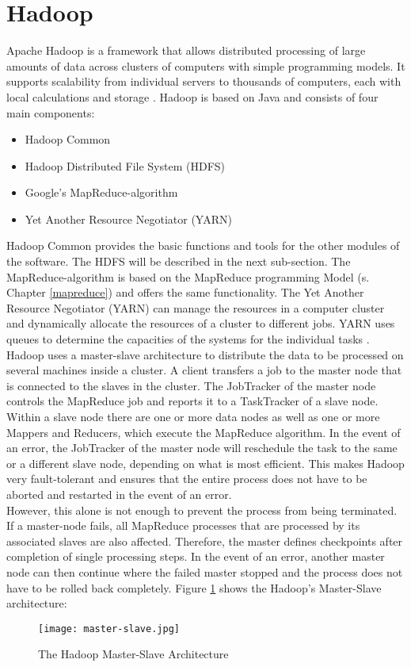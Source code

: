 \section{Hadoop}
\label{hadoop}
Apache Hadoop is a framework that allows distributed processing of large amounts of data across clusters of computers with simple programming models. It supports scalability from individual servers to thousands of computers, each with local calculations and storage \cite[][]{AP02}. Hadoop is based on Java and consists of four main components:
\begin{itemize}
	\item Hadoop Common
	\item Hadoop Distributed File System (HDFS)
	\item Google's MapReduce-algorithm
	\item Yet Another Resource Negotiator (YARN)
\end{itemize}
Hadoop Common provides the basic functions and tools for the other modules of the software. The HDFS will be described in the next sub-section. The MapReduce-algorithm is based on the MapReduce programming Model (s. Chapter \ref{mapreduce}) and offers the same functionality. The Yet Another Resource Negotiator (YARN) can manage the resources in a computer cluster and dynamically allocate the resources of a cluster to different jobs. YARN uses queues to determine the capacities of the systems for the individual tasks \cite[][]{NL01}. 
\\
Hadoop uses a master-slave architecture to distribute the data to be processed on several machines inside a cluster. A client transfers a job to the master node that is connected to the slaves in the cluster. The JobTracker of the master node controls the MapReduce job and reports it to a TaskTracker of a slave node. Within a slave node there are one or more data nodes as well as one or more Mappers and Reducers, which execute the MapReduce algorithm. In the event of an error, the JobTracker of the master node will reschedule the task to the same or a different slave node, depending on what is most efficient. This makes Hadoop very fault-tolerant and ensures that the entire process does not have to be aborted and restarted in the event of an error. \cite[][]{RO01}
\\
However, this alone is not enough to prevent the process from being terminated. If a master-node fails, all MapReduce processes that are processed by its associated slaves are also affected. Therefore, the master defines checkpoints after completion of single processing steps. In the event of an error, another master node can then continue where the failed master stopped and the process does not have to be rolled back completely. Figure \ref{master-slave} shows the Hadoop's Master-Slave architecture:
\begin{figure}[H]
	\centering
	\texttt{[image: master-slave.jpg]}
	\caption[Caption for LOF]{The Hadoop Master-Slave Architecture\footnotemark}
	\label{master-slave}
\end{figure}
